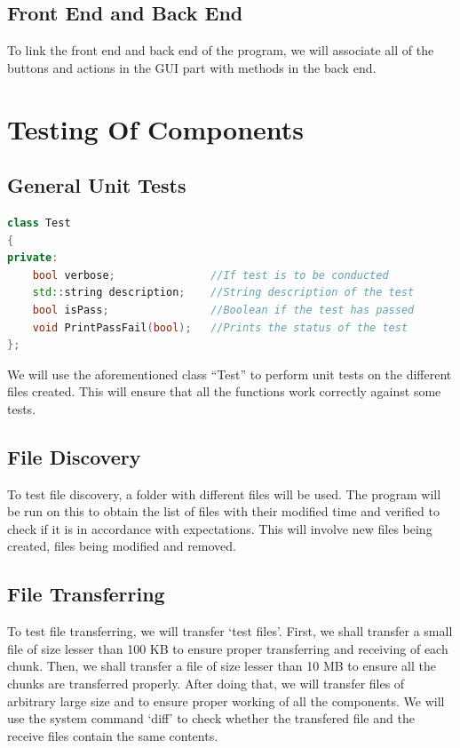 \documentclass{article}
\begin{document}
			\subsection{Front End and Back End}
				To link the front end and back end of the program, we will associate all of the buttons and actions in the GUI part with methods in the back end. 

	\section{Testing Of Components}
			\subsection{General Unit Tests}
				\begin{lstlisting}[language=C++, caption={Class Parameters for Test}]
class Test
{
private:
	bool verbose;               //If test is to be conducted
	std::string description;    //String description of the test
	bool isPass;                //Boolean if the test has passed 
	void PrintPassFail(bool);   //Prints the status of the test
};
				\end{lstlisting}

				We will use the aforementioned class ``Test'' to perform unit tests on the different files created. This will ensure that all the functions work correctly against some tests.

			\subsection{File Discovery}
				To test file discovery, a folder with different files will be used. The program will be run on this to obtain the list of files with their modified time and verified to check if it is in accordance with expectations. This will involve new files being created, files being modified and removed.
			\subsection{File Transferring}
				To test file transferring, we will transfer `test files'. First, we shall transfer a small file of size lesser than 100 KB to ensure proper transferring and receiving of each chunk. Then, we shall transfer a file of size lesser than 10 MB to ensure all the chunks are transferred properly. After doing that, we will transfer files of arbitrary large size and to ensure proper working of all the components. We will use the system command `diff' to check whether the transfered file and the receive files contain the same contents.
\end{document}

